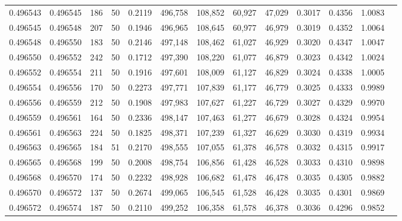 \begin{tabular}{rrrrrrrrrrrrr}
0.496543 & 0.496545 &   186 &  50 &                                     0.2119 & 496,758 & 108,852 &  60,927 &  47,029 & 0.3017 & 0.4356 & 1.0083 \\
0.496545 & 0.496548 &   207 &  50 &                                     0.1946 & 496,965 & 108,645 &  60,977 &  46,979 & 0.3019 & 0.4352 & 1.0064 \\
0.496548 & 0.496550 &   183 &  50 &                                     0.2146 & 497,148 & 108,462 &  61,027 &  46,929 & 0.3020 & 0.4347 & 1.0047 \\
0.496550 & 0.496552 &   242 &  50 &                                     0.1712 & 497,390 & 108,220 &  61,077 &  46,879 & 0.3023 & 0.4342 & 1.0024 \\
0.496552 & 0.496554 &   211 &  50 &                                     0.1916 & 497,601 & 108,009 &  61,127 &  46,829 & 0.3024 & 0.4338 & 1.0005 \\
0.496554 & 0.496556 &   170 &  50 &                                     0.2273 & 497,771 & 107,839 &  61,177 &  46,779 & 0.3025 & 0.4333 & 0.9989 \\
0.496556 & 0.496559 &   212 &  50 &                                     0.1908 & 497,983 & 107,627 &  61,227 &  46,729 & 0.3027 & 0.4329 & 0.9970 \\
0.496559 & 0.496561 &   164 &  50 &                                     0.2336 & 498,147 & 107,463 &  61,277 &  46,679 & 0.3028 & 0.4324 & 0.9954 \\
0.496561 & 0.496563 &   224 &  50 &                                     0.1825 & 498,371 & 107,239 &  61,327 &  46,629 & 0.3030 & 0.4319 & 0.9934 \\
0.496563 & 0.496565 &   184 &  51 &                                     0.2170 & 498,555 & 107,055 &  61,378 &  46,578 & 0.3032 & 0.4315 & 0.9917 \\
0.496565 & 0.496568 &   199 &  50 &                                     0.2008 & 498,754 & 106,856 &  61,428 &  46,528 & 0.3033 & 0.4310 & 0.9898 \\
0.496568 & 0.496570 &   174 &  50 &                                     0.2232 & 498,928 & 106,682 &  61,478 &  46,478 & 0.3035 & 0.4305 & 0.9882 \\
0.496570 & 0.496572 &   137 &  50 &                                     0.2674 & 499,065 & 106,545 &  61,528 &  46,428 & 0.3035 & 0.4301 & 0.9869 \\
0.496572 & 0.496574 &   187 &  50 &                                     0.2110 & 499,252 & 106,358 &  61,578 &  46,378 & 0.3036 & 0.4296 & 0.9852 \\

\end{tabular}
